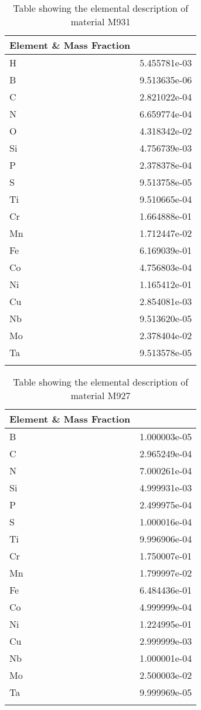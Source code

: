 \begin{centering}
\begin{longtable}[ht!]
{ p{} | p{} }
\hline
Element \& Mass Fraction\\
\hline
H &  5.455781e-03\\
B &  9.513635e-06\\
C &  2.821022e-04\\
N &  6.659774e-04\\
O &  4.318342e-02\\
Si &  4.756739e-03\\
P &  2.378378e-04\\
S &  9.513758e-05\\
Ti &  9.510665e-04\\
Cr &  1.664888e-01\\
Mn &  1.712447e-02\\
Fe &  6.169039e-01\\
Co &  4.756803e-04\\
Ni &  1.165412e-01\\
Cu &  2.854081e-03\\
Nb &  9.513620e-05\\
Mo &  2.378404e-02\\
Ta &  9.513578e-05\\
\caption{Table showing the elemental description of material M931}
\label{table:material_UPDFW2}
\end{longtable}
\clearpage

\begin{longtable}[ht!]
{ p{} | p{} }
\hline
Element \& Mass Fraction\\
\hline
B &  1.000003e-05\\
C &  2.965249e-04\\
N &  7.000261e-04\\
Si &  4.999931e-03\\
P &  2.499975e-04\\
S &  1.000016e-04\\
Ti &  9.996906e-04\\
Cr &  1.750007e-01\\
Mn &  1.799997e-02\\
Fe &  6.484436e-01\\
Co &  4.999999e-04\\
Ni &  1.224995e-01\\
Cu &  2.999999e-03\\
Nb &  1.000001e-04\\
Mo &  2.500003e-02\\
Ta &  9.999969e-05\\
\caption{Table showing the elemental description of material M927}
\label{table:material_PPWheelsDrives}
\end{longtable}
\clearpage


\end{centering}
